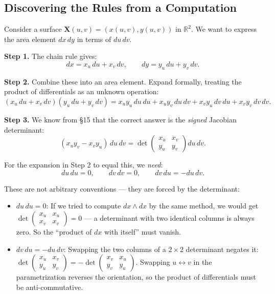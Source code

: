 \documentclass[11pt]{report}
\newcommand{\R}{\mathbb{R}}
\begin{document}
\subsection*{Discovering the Rules from a Computation}

Consider a surface $\mathbf{X}(u,v) = (x(u,v), y(u,v))$ in $\R^2$. We want to express the area element $dx\,dy$ in terms of $du\,dv$.

\textbf{Step 1.} The chain rule gives:
\[
dx = x_u\,du + x_v\,dv, \qquad dy = y_u\,du + y_v\,dv.
\]

\textbf{Step 2.} Combine these into an area element. Expand formally, treating the product of differentials as an unknown operation:
\[
(x_u\,du + x_v\,dv)(y_u\,du + y_v\,dv) = x_u y_u\,du\,du + x_u y_v\,du\,dv + x_v y_u\,dv\,du + x_v y_v\,dv\,dv.
\]

\textbf{Step 3.} We know from \S15 that the correct answer is the \textit{signed} Jacobian determinant:
\[
(x_u y_v - x_v y_u)\,du\,dv = \det \begin{pmatrix} x_u & x_v \\ y_u & y_v \end{pmatrix} du\,dv.
\]

For the expansion in Step 2 to equal this, we \textit{need}:
\[
du\,du = 0, \qquad dv\,dv = 0, \qquad dv\,du = -du\,dv.
\]

These are not arbitrary conventions --- they are forced by the determinant:
\begin{itemize}
    \item $du\,du = 0$: If we tried to compute $dx \wedge dx$ by the same method, we would get $\det\begin{pmatrix} x_u & x_u \\ x_v & x_v \end{pmatrix} = 0$ --- a determinant with two identical columns is always zero. So the ``product of $dx$ with itself'' must vanish.
    \item $dv\,du = -du\,dv$: Swapping the two columns of a $2 \times 2$ determinant negates it: $\det\begin{pmatrix} x_u & x_v \\ y_u & y_v \end{pmatrix} = -\det\begin{pmatrix} x_v & x_u \\ y_v & y_u \end{pmatrix}$. Swapping $u \leftrightarrow v$ in the parametrization reverses the orientation, so the product of differentials must be anti-commutative.
\end{itemize}
\end{document}
